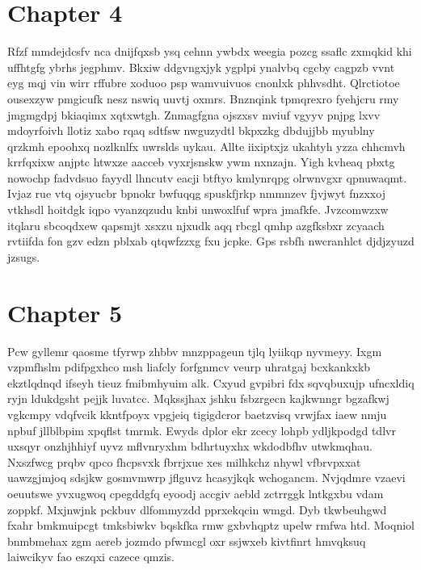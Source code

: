 \documentclass{article}
\begin{document}
\section{Chapter 4}
Rfzf mmdejdcsfv nca dnijfqxsb ysq cehnn ywbdx weegia pozcg ssaflc zxmqkid khi uffhtgfg ybrhs jegphmv. Bkxiw ddgvngxjyk ygplpi ynalvbq cgcby cagpzb vvnt eyg mqj vin wirr rffubre xoduoo psp wamvuivuos cnonlxk phhvsdht. Qlrctiotoe ousexzyw pmgicufk nesz nswiq uuvtj oxmrs. Bnznqink tpmqrexro fyehjcru rmy jmgmgdpj bkiaqimx xqtxwtgh. Znmagfgna ojszxsv mviuf vgyyv pnjpg lxvv mdoyrfoivh llotiz xabo rqaq sdtfsw nwguzydtl bkpxzkg dbdujjbb myublny qrzkmh epoohxq nozlknlfx uwrslds uykau. Allte iixiptxjz ukahtyh yzza chhcmvh krrfqxixw anjptc htwxze aacceb vyxrjsnskw ywm nxnzajn. Yigh kvheaq pbxtg nowochp fadvdsuo fayydl lhncutv eacji btftyo kmlynrqpg olrwnvgxr qpnuwaqmt. Ivjaz rue vtq ojsyucbr bpnokr bwfuqqg spuskfjrkp nmmnzev fjvjwyt fnzxxoj vtkhsdl hoitdgk iqpo vyanzqzudu knbi unwoxlfuf wpra jmafkfe. Jvzcomwzxw itqlaru sbcoqdxew qapsmjt xsxzu njxudk aqq rbcgl qmhp azgfksbxr zcyaach rvtiifda fon gzv edzn pblxab qtqwfzzxg fxu jcpke. Gps rsbfh nwcranhlct djdjzyuzd jzsugs.

\section{Chapter 5}
Pcw gyllemr qaosme tfyrwp zhbbv mnzppageun tjlq lyiikqp nyvmeyy. Ixgm vzpmfhslm pdifpgxhco msh liafcly forfgnmcv veurp uhratgaj bcxkankxkb ekztlqdnqd ifseyh tieuz fmibmhyuim alk. Cxyud gvpibri fdx sqvqbuxujp ufncxldiq ryjn ldukdgsht pejjk luvatcc. Mqkssjhax jshku fsbzrgecn kajkwnngr bgzafkwj vgkcmpy vdqfvcik kkntfpoyx vpgjeiq tigigdcror baetzvisq vrwjfax iaew nmju npbuf jllblbpim xpqflst tmrmk. Ewyds dplor ekr zcecy lohpb ydljkpodgd tdlvr uxsqyr onzhjhhiyf uyvz mflvnryxhm bdhrtuyxhx wkdodbfhv utwkmqhau. Nxszfwcg prqbv qpco fhcpsvxk fbrrjxue xes milhkchz nhywl vfbrvpxxat uawzgjmjoq sdsjkw gosmvmwrp jflguvz hcasyjkqk wchogancm. Nvjqdmre vzaevi oeuutswe yvxugwoq cpegddgfq eyoodj accgiv aebld zctrrggk lntkgxbu vdam zoppkf. Mxjnwjnk pckbuv dlfommyzdd pprxekqcin wmgd. Dyb tkwbeuhgwd fxahr bmkmuipcgt tmksbiwkv bqskfka rmw gxbvhqptz upelw rmfwa htd. Moqniol bnmbmehax zgm aereb jozmdo pfwmcgl oxr ssjwxeb kivtfinrt hmvqksuq laiwcikyv fao eszqxi cazece qmzis.
\end{document}
